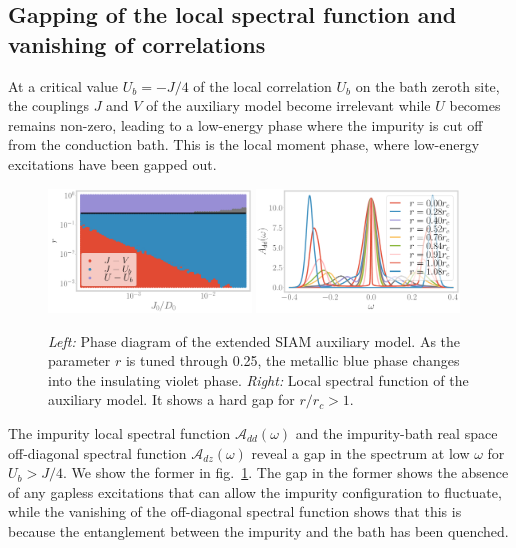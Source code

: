 \documentclass[prb]{revtex4-2}
\begin{document}
\subsection{Gapping of the local spectral function and vanishing of correlations}
At a critical value \(U_b = -J/4\) of the local correlation \(U_b\) on the bath zeroth site, the couplings \(J\) and \(V\) of the auxiliary model become irrelevant while \(U\) becomes remains non-zero, leading to a low-energy phase where the impurity is cut off from the conduction bath. This is the local moment phase, where low-energy excitations have been gapped out.
\begin{figure}[htpb]
	\centering
	\includegraphics[width=0.48\textwidth]{phase-map-MIT.pdf}
	\includegraphics[width=0.48\textwidth]{spectral-function_dd.pdf}
	\caption{{\it Left:} Phase diagram of the extended SIAM auxiliary model. As the parameter \(r\) is tuned through 0.25, the metallic blue phase changes into the insulating violet phase. {\it Right:} Local spectral function of the auxiliary model. It shows a hard gap for \(r/r_c > 1\).}
	\label{spec_func_mit}
\end{figure}

The impurity local spectral function \(\mathcal{A}_{dd}(\omega)\) and the impurity-bath real space off-diagonal spectral function \(\mathcal{A}_{dz}(\omega)\) reveal a gap in the spectrum at low \(\omega\) for \(U_b > J/4\). We show the former in fig.~\ref{spec_func_mit}. The gap in the former shows the absence of any gapless excitations that can allow the impurity configuration to fluctuate, while the vanishing of the off-diagonal spectral function shows that this is because the entanglement between the impurity and the bath has been quenched. 
\end{document}

